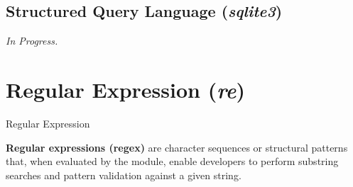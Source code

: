 \documentclass[10pt]{article}
\begin{document}
  \subsection{Structured Query Language (\textit{sqlite3})}

    \textit{In Progress.}

\section{Regular Expression (\textit{re})}
  \label{sec:regex}

  \begin{core}[label=core:regex]{Regular Expression}

    \textbf{Regular expressions (regex)} are character sequences or structural patterns that, when evaluated by the  module, enable developers to perform substring searches and pattern validation against a given string.

  \end{core}
\end{document}
